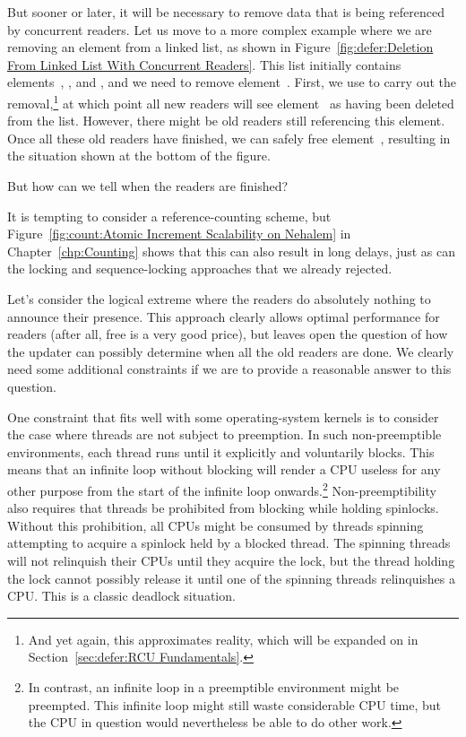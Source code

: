 But sooner or later, it will be necessary to remove data that is
being referenced by concurrent readers.
Let us move to a more complex example where we are removing an element
from a linked list, as shown in
Figure~\ref{fig:defer:Deletion From Linked List With Concurrent Readers}.
This list initially contains elements~, , and ,
and we need to remove element~.
First, we use  to carry out the removal,\footnote{
	And yet again, this approximates reality, which will be expanded
	on in Section~\ref{sec:defer:RCU Fundamentals}.}
at which point all new readers will see element~ as having been
deleted from the list.
However, there might be old readers still referencing this element.
Once all these old readers have finished, we can safely free
element~, resulting in the situation shown at the bottom of
the figure.

But how can we tell when the readers are finished?

It is tempting to consider a reference-counting scheme, but
Figure~\ref{fig:count:Atomic Increment Scalability on Nehalem}
in
Chapter~\ref{chp:Counting}
shows that this can also result in long delays, just as can
the locking and sequence-locking approaches that we already rejected.

Let's consider the logical extreme where the readers do absolutely
nothing to announce their presence.
This approach clearly allows optimal performance for readers
(after all, free is a very good price),
but leaves open the question of how the updater can possibly
determine when all the old readers are done.
We clearly need some additional constraints if we are to provide
a reasonable answer to this question.

One constraint that fits well with some operating-system kernels is to
consider the case where threads are not subject to preemption.
In such non-preemptible environments, each thread runs until it
explicitly and voluntarily blocks.
This means that an infinite loop without blocking will render a CPU
useless for any other purpose from the start of the infinite loop
onwards.\footnote{
	In contrast, an infinite loop in a preemptible environment
	might be preempted.
	This infinite loop might still waste considerable CPU time,
	but the CPU in question would nevertheless be able to do
	other work.}
Non-preemptibility also requires that threads be prohibited from blocking
while holding spinlocks.
Without this prohibition, all CPUs might be consumed by threads
spinning attempting to acquire a spinlock held by a blocked thread.
The spinning threads will not relinquish their CPUs until they acquire
the lock, but the thread holding the lock cannot possibly release it
until one of the spinning threads relinquishes a CPU.
This is a classic deadlock situation.

